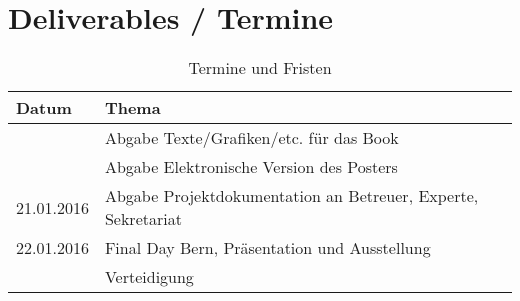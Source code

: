 \section{Deliverables / Termine}
\begin{table}[h!]
\begin{tabularx}{\textwidth}{|l|X|}

 \hline
 {\bf Datum } & {\bf Thema } \\ 
 \hline
              & Abgabe Texte/Grafiken/etc. für das Book  \\ \hline
              & Abgabe Elektronische Version des Posters  \\ \hline
 21.01.2016   & Abgabe Projektdokumentation an Betreuer, Experte, Sekretariat  \\ \hline
 22.01.2016   & Final Day Bern, Präsentation und Ausstellung  \\ \hline
              & Verteidigung \\ \hline

\end{tabularx}
\caption{Termine und Fristen}
\end{table}